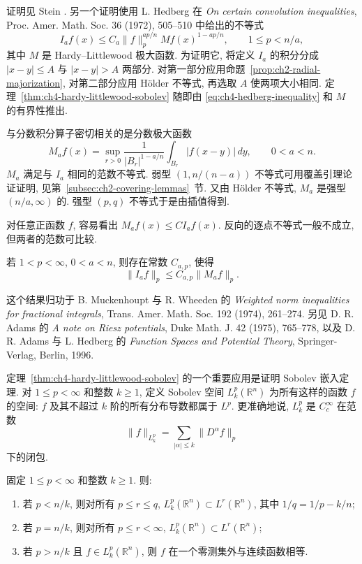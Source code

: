 证明见 Stein . 另一个证明使用 L. Hedberg 在 \emph{On certain convolution inequalities}, Proc. Amer. Math. Soc. 36 (1972), 505--510 中给出的不等式
\begin{equation}
\label{eq:ch4-hedberg-inequality}
 I_af(x)\le C_a\|f\|_p^{ap/n}Mf(x)^{1-ap/n},
 \qquad 1\le p<n/a,
\end{equation}
其中 $M$ 是 Hardy--Littlewood 极大函数. 为证明它, 将定义 $I_a$ 的积分分成 $|x-y|\le A$ 与 $|x-y|>A$ 两部分. 对第一部分应用命题~\ref{prop:ch2-radial-majorization}, 对第二部分应用 Hölder 不等式, 再选取 $A$ 使两项大小相同. 定理~\ref{thm:ch4-hardy-littlewood-sobolev} 随即由 \eqref{eq:ch4-hedberg-inequality} 和 $M$ 的有界性推出.

与分数积分算子密切相关的是分数极大函数
\[
 M_af(x)=\sup_{r>0}\frac1{|B_r|^{1-a/n}}
 \int_{B_r}|f(x-y)|\,dy,
 \qquad 0<a<n.
\]
$M_a$ 满足与 $I_a$ 相同的范数不等式. 弱型 $(1,n/(n-a))$ 不等式可用覆盖引理论证证明, 见第~\ref{subsec:ch2-covering-lemmas}~节. 又由 Hölder 不等式, $M_a$ 是强型 $(n/a,\infty)$ 的. 强型 $(p,q)$ 不等式于是由插值得到.

对任意正函数 $f$, 容易看出 $M_af(x)\le CI_af(x)$. 反向的逐点不等式一般不成立, 但两者的范数可比较.

\hypertarget{chapter-04-page-102}{}
\begin{Theorem}
\label{thm:ch4-fractional-integral-maximal-comparison}
若 $1<p<\infty$, $0<a<n$, 则存在常数 $C_{a,p}$, 使得
\[
 \|I_af\|_p\le C_{a,p}\|M_af\|_p.
\]
\end{Theorem}

这个结果归功于 B. Muckenhoupt 与 R. Wheeden 的 \emph{Weighted norm inequalities for fractional integrals}, Trans. Amer. Math. Soc. 192 (1974), 261--274. 另见 D. R. Adams 的 \emph{A note on Riesz potentials}, Duke Math. J. 42 (1975), 765--778, 以及 D. R. Adams 与 L. Hedberg 的 \emph{Function Spaces and Potential Theory}, Springer-Verlag, Berlin, 1996.

定理~\ref{thm:ch4-hardy-littlewood-sobolev} 的一个重要应用是证明 Sobolev 嵌入定理. 对 $1\le p<\infty$ 和整数 $k\ge1$, 定义 Sobolev 空间 $L_k^p(\mathbb R^n)$ 为所有这样的函数 $f$ 的空间: $f$ 及其不超过 $k$ 阶的所有分布导数都属于 $L^p$. 更准确地说, $L_k^p$ 是 $C_c^\infty$ 在范数
\[
 \|f\|_{L_k^p}=\sum_{|\alpha|\le k}\|D^\alpha f\|_p
\]
下的闭包.

\begin{Theorem}
\label{thm:ch4-sobolev-embedding}
固定 $1\le p<\infty$ 和整数 $k\ge1$. 则:
\begin{enumerate}
\item 若 $p<n/k$, 则对所有 $p\le r\le q$, $L_k^p(\mathbb R^n)\subset L^r(\mathbb R^n)$, 其中 $1/q=1/p-k/n$;
\item 若 $p=n/k$, 则对所有 $p\le r<\infty$, $L_k^p(\mathbb R^n)\subset L^r(\mathbb R^n)$;
\item 若 $p>n/k$ 且 $f\in L_k^p(\mathbb R^n)$, 则 $f$ 在一个零测集外与连续函数相等.
\end{enumerate}
\end{Theorem}

